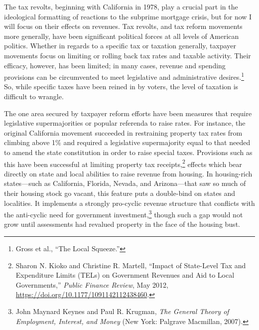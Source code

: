 \documentclass[12pt,oneside]{psthesis}
\begin{document}
The tax revolts, beginning with California in 1978, play a crucial part in the ideological formatting of reactions to the subprime mortgage crisis, but for now I will focus on their effects on revenues.
Tax revolts, and tax reform movements more generally, have been significant political forces at all levels of American politics.
Whether in regards to a specific tax or taxation generally, taxpayer movements focus on limiting or rolling back tax rates and taxable activity.
Their efficacy, however, has been limited; in many cases, revenue and spending provisions can be circumvented to meet legislative and administrative desires.\footnote{Gross et al., ``The Local Squeeze.''}
So, while specific taxes have been reined in by voters, the level of taxation is difficult to wrangle.

The one area secured by taxpayer reform efforts have been measures that require legislative supermajorities or popular referenda to raise rates.
For instance, the original California movement succeeded in restraining property tax rates from climbing above 1\% and required a legislative supermajority equal to that needed to amend the state constitution in order to raise special taxes.
Provisions such as this have been successful at limiting property tax receipts,\footnote{Sharon N. Kioko and Christine R. Martell, ``Impact of State-Level Tax and Expenditure Limits (TELs) on Government Revenues and Aid to Local Governments,'' \emph{Public Finance Review}, May 2012, \url{https://doi.org/10.1177/1091142112438460}.} effects which bear directly on state and local abilities to raise revenue from housing.
In housing-rich states---such as California, Florida, Nevada, and Arizona---that saw so much of their housing stock go vacant, this feature puts a double-bind on states and localities.
It implements a strongly pro-cyclic revenue structure that conflicts with the anti-cyclic need for government investment,\footnote{John Maynard Keynes and Paul R. Krugman, \emph{The General Theory of Employment, Interest, and Money} (New York: Palgrave Macmillan, 2007).} though such a gap would not grow until assessments had revalued property in the face of the housing bust.
\end{document}
